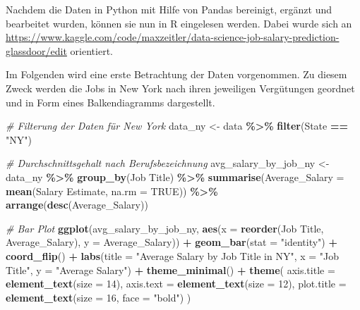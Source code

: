 \documentclass[
]{article}
\newenvironment{Shaded}{\begin{snugshade}}{\end{snugshade}}
\newcommand{\AttributeTok}[1]{\textcolor[rgb]{0.13,0.29,0.53}{#1}}
\newcommand{\CommentTok}[1]{\textcolor[rgb]{0.56,0.35,0.01}{\textit{#1}}}
\newcommand{\ConstantTok}[1]{\textcolor[rgb]{0.56,0.35,0.01}{#1}}
\newcommand{\DecValTok}[1]{\textcolor[rgb]{0.00,0.00,0.81}{#1}}
\newcommand{\FunctionTok}[1]{\textcolor[rgb]{0.13,0.29,0.53}{\textbf{#1}}}
\newcommand{\NormalTok}[1]{#1}
\newcommand{\OtherTok}[1]{\textcolor[rgb]{0.56,0.35,0.01}{#1}}
\newcommand{\SpecialCharTok}[1]{\textcolor[rgb]{0.81,0.36,0.00}{\textbf{#1}}}
\newcommand{\StringTok}[1]{\textcolor[rgb]{0.31,0.60,0.02}{#1}}
\begin{document}
Nachdem die Daten in Python mit Hilfe von Pandas bereinigt, ergänzt und
bearbeitet wurden, können sie nun in R eingelesen werden. Dabei wurde
sich an
\url{https://www.kaggle.com/code/maxzeitler/data-science-job-salary-prediction-glassdoor/edit}
orientiert.

Im Folgenden wird eine erste Betrachtung der Daten vorgenommen. Zu
diesem Zweck werden die Jobs in New York nach ihren jeweiligen
Vergütungen geordnet und in Form eines Balkendiagramms dargestellt.

\begin{Shaded}
\begin{Highlighting}[]
\CommentTok{\# Filterung der Daten für New York}
\NormalTok{data\_ny }\OtherTok{\textless{}{-}}\NormalTok{ data }\SpecialCharTok{\%\textgreater{}\%}
  \FunctionTok{filter}\NormalTok{(State }\SpecialCharTok{==} \StringTok{"NY"}\NormalTok{)}

\CommentTok{\# Durchschnittsgehalt nach Berufsbezeichnung}
\NormalTok{avg\_salary\_by\_job\_ny }\OtherTok{\textless{}{-}}\NormalTok{ data\_ny }\SpecialCharTok{\%\textgreater{}\%}
  \FunctionTok{group\_by}\NormalTok{(}\StringTok{\textasciigrave{}}\AttributeTok{Job Title}\StringTok{\textasciigrave{}}\NormalTok{) }\SpecialCharTok{\%\textgreater{}\%}
  \FunctionTok{summarise}\NormalTok{(}\AttributeTok{Average\_Salary =} \FunctionTok{mean}\NormalTok{(}\StringTok{\textasciigrave{}}\AttributeTok{Salary Estimate}\StringTok{\textasciigrave{}}\NormalTok{, }\AttributeTok{na.rm =} \ConstantTok{TRUE}\NormalTok{)) }\SpecialCharTok{\%\textgreater{}\%}
  \FunctionTok{arrange}\NormalTok{(}\FunctionTok{desc}\NormalTok{(Average\_Salary))}

\CommentTok{\# Bar Plot}
\FunctionTok{ggplot}\NormalTok{(avg\_salary\_by\_job\_ny,}
       \FunctionTok{aes}\NormalTok{(}\AttributeTok{x =} \FunctionTok{reorder}\NormalTok{(}\StringTok{\textasciigrave{}}\AttributeTok{Job Title}\StringTok{\textasciigrave{}}\NormalTok{, Average\_Salary), }\AttributeTok{y =}\NormalTok{ Average\_Salary)) }\SpecialCharTok{+}
  \FunctionTok{geom\_bar}\NormalTok{(}\AttributeTok{stat =} \StringTok{"identity"}\NormalTok{) }\SpecialCharTok{+}
  \FunctionTok{coord\_flip}\NormalTok{() }\SpecialCharTok{+}
  \FunctionTok{labs}\NormalTok{(}\AttributeTok{title =} \StringTok{"Average Salary by Job Title in NY"}\NormalTok{,}
       \AttributeTok{x =} \StringTok{"Job Title"}\NormalTok{,}
       \AttributeTok{y =} \StringTok{"Average Salary"}\NormalTok{) }\SpecialCharTok{+}
  \FunctionTok{theme\_minimal}\NormalTok{() }\SpecialCharTok{+}
  \FunctionTok{theme}\NormalTok{(}
    \AttributeTok{axis.title =} \FunctionTok{element\_text}\NormalTok{(}\AttributeTok{size =} \DecValTok{14}\NormalTok{),}
    \AttributeTok{axis.text =} \FunctionTok{element\_text}\NormalTok{(}\AttributeTok{size =} \DecValTok{12}\NormalTok{),}
    \AttributeTok{plot.title =} \FunctionTok{element\_text}\NormalTok{(}\AttributeTok{size =} \DecValTok{16}\NormalTok{, }\AttributeTok{face =} \StringTok{"bold"}\NormalTok{)}
\NormalTok{  )}
\end{Highlighting}
\end{Shaded}
\end{document}
